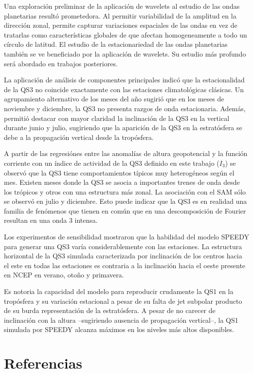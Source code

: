 \documentclass[spanish,a4paper,12pt,oneside]{book}
\begin{document}
Una exploración preliminar de la aplicación de wavelets al estudio de
las ondas planetarias resultó prometedora. Al permitir variabilidad de
la amplitud en la dirección zonal, permite capturar variaciones
espaciales de las ondas en vez de tratarlas como características
globales de que afectan homogeneamente a todo un círculo de latitud. El
estudio de la estacionariedad de las ondas planetarias también se ve
beneficiado por la aplicación de wavelets. Su estudio más profundo será
abordado en trabajos posteriores.

La aplicación de análisis de componentes principales indicó que la
estacionalidad de la QS3 no coincide exactamente con las estaciones
climatológicas clásicas. Un agrupamiento alternativo de los meses del
año sugirió que en los meses de noviembre y diciembre, la QS3 no
presenta razgos de onda estacionaria. Además, permitió destacar con
mayor claridad la inclinación de la QS3 en la vertical durante junio y
julio, sugiriendo que la aparición de la QS3 en la estratósfera se debe
a la propagación vertical desde la tropósfera.

A partir de las regresiónes entre las anomalías de altura geopotencial y
la función corriente con un índice de actividad de la QS3 definido en
este trabajo (\(I_3\)) se observó que la QS3 tiene comportamientos
típicos muy heterogéneos según el mes. Existen meses donde la QS3 se
asocia a importantes trenes de onda desde los trópicos y otros con una
estructura más zonal. La asociación con el SAM sólo se observó en julio
y diciembre. Esto puede indicar que la QS3 es en realidad una familia de
fenómenos que tienen en común que en una descomposición de Fourier
resultan en una onda 3 intensa.

Los experimentos de sensibilidad mostraron que la habilidad del modelo
SPEEDY para generar una QS3 varía considerablemente con las estaciones.
La estructura horizontal de la QS3 simulada caracterizada por
inclinación de los centros hacia el este en todas las estaciones es
contraria a la inclinación hacia el oeste presente en NCEP en verano,
otoño y primavera.

Es notoria la capacidad del modelo para reproducir crudamente la QS1 en
la tropósfera y su variación estacional a pesar de su falta de jet
subpolar producto de su burda representación de la estratósfera. A pesar
de no carecer de inclinación con la altura --sugiriendo ausencia de
propagación vertical--, la QS1 simulada por SPEEDY alcanza máximos en
los niveles más altos disponibles.

\chapter*{Referencias}\label{referencias}
\end{document}
